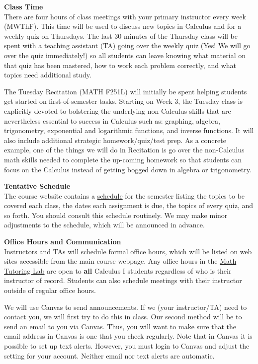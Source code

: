 \documentclass[12pt]{article}
\renewcommand{\emph}[1]{\textsf{\textbf{#1}}}
\newcommand{\localhead}[1]{\par\smallskip\textbf{#1}\nobreak\\}%
\def\heading#1{\localhead{\large\emph{#1}}}
\begin{document}
\newpage

\heading{Class Time}
There are four hours of class meetings with your primary instructor every week (MWThF). This time will be used to discuss new topics in Calculus and for a weekly quiz on Thursdays. The last 30 minutes of the Thursday class will be spent with a teaching assistant (TA) going over the weekly quiz (Yes! We will go over the quiz immediately!) so all students can leave knowing what material on that quiz has been mastered, how to work each problem correctly,  and what topics need additional study. 

The Tuesday Recitation (MATH F251L) will initially be spent helping students get started on first-of-semester tasks. Starting on Week 3, the Tuesday class is explicitly devoted to bolstering the underlying non-Calculus skills that are nevertheless essential to success in Calculus such as: graphing, algebra, trigonometry, exponential and logarithmic functions, and inverse functions. It will also include additional strategic homework/quiz/test prep. As a concrete example, one of the things we will do in Recitation is go over the non-Calculus math skills needed to complete the up-coming homework so that students can focus on the Calculus instead of getting bogged down in algebra or trigonometry.

\heading{Tentative Schedule}
The course website contains a \href{https://docs.google.com/spreadsheets/d/e/2PACX-1vQGc6J1T0q0ik53Vks8LatvLNG9OMWIlA9mkIOz6BWO9KZecpv0yYPTKDhgKxS-UxQ809bjz4kUVgbk/pubhtml?gid=0&single=true}{schedule} for the semester listing
the topics to be covered each class, the dates each assignment is due,
the topics of every quiz, and so forth. You should consult this schedule
routinely.  We may make minor adjustments to the schedule, which
will be announced in advance.

\heading{Office Hours and Communication}
Instructors and TAs will schedule formal office hours,
which will be listed on web sites accessible from the main
course webpage. Any office hours in the \href{https://uaf.edu/dms/mathlab/}{Math Tutoring Lab} are open to \emph{all} Calculus I students regardless of who is their instructor of record. Students can also schedule meetings with their instructor outside of regular office hours. 

We will use Canvas to send announcements. If we (your instructor/TA) need to contact you, we will first try to do this in class. Our second method will be to send an email to you via Canvas. Thus, you will want to make sure that the email address in Canvas is one that you check regularly. Note that in Canvas it is possible to set up text alerts. However, you must login to Canvas and adjust the setting for your account. Neither email nor text alerts are automatic.
\end{document}
